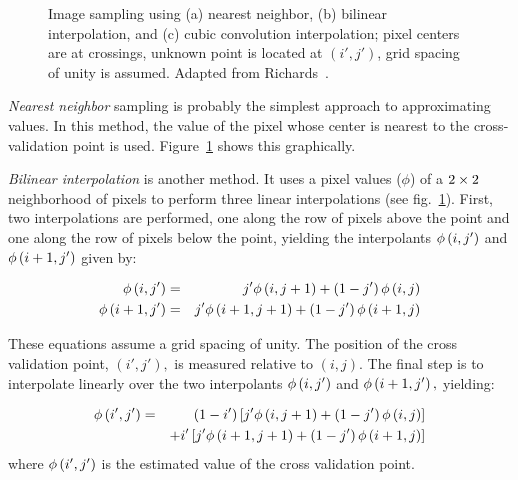 \begin{figure}
\caption{Image sampling using (a) nearest neighbor, (b) bilinear interpolation,
and (c) cubic convolution interpolation; pixel centers are at crossings, 
unknown point is located at $(i',j')$, grid spacing of unity is assumed.
Adapted from Richards~\protect\cite{richards93}.}
\label{fig:sampling}
\end{figure}

{\em Nearest neighbor\/} sampling is probably the simplest approach
to approximating values.
In this method, the value of the pixel whose center is nearest to 
the cross-validation point is used. Figure~\ref{fig:sampling}
shows this graphically.

{\em Bilinear interpolation\/} is another method. It uses a 
pixel values ($\phi$) of a
$2\times2\/$ neighborhood of pixels to perform three linear
interpolations (see fig.~\ref{fig:sampling}). First, two
interpolations are performed, one along the row of pixels above the
point and one along the row of pixels below the point, yielding
the interpolants $\phi\left(i, j'\right)\/$ and $\phi\left(i+1, j'\right)\/$ given
by:

\begin{eqnarray}
  \phi\left(i, j'\right) & = & j' \phi\left(i,j+1\right) + \left(1-j'\right)\phi\left(i,j\right)\\
\phi\left(i+1, j'\right) & = & j' \phi\left(i+1,j+1\right) + \left(1-j'\right)\phi\left(i+1,j\right)
\end{eqnarray}

\noindent These equations assume a grid spacing of unity.
The position of the cross validation point, $\left(i',j'\right),$ 
is measured relative to $\left(i,j\right).$  The final
step is to interpolate linearly over the two interpolants
$\phi\left(i, j'\right)\/$ and $\phi\left(i+1, j'\right),$ yielding:

\begin{eqnarray}
  \phi\left(i',j'\right) & = & \left(1-i'\right)\left[j'\phi\left(i,j+1\right)+\left(1-j'\right)
                                           \phi\left(i,j\right)\right]\\ \nonumber
                &   & + i'\left[j'\phi\left(i+1,j+1\right)+\left(1-j'\right)
                             \phi\left(i+1,j\right)\right]
\end{eqnarray}
where $\phi\left(i',j'\right)\/$ is the estimated value of the cross
validation point.

